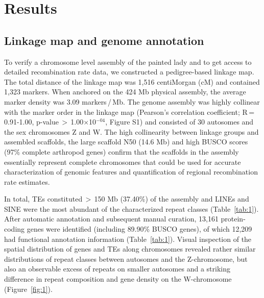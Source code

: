 \documentclass[twocolumn]{bmcart}%
\begin{document}
\section*{Results}
\subsection*{Linkage map and genome annotation}
To verify a chromosome level assembly of the painted lady \citep{lohse_genome_2021} and to get access to detailed recombination rate data, we constructed a pedigree-based linkage map. The total distance of the linkage map was 1,516 centiMorgan (cM) and contained 1,323 markers. When anchored on the 424 Mb physical assembly, the average marker density was 3.09 markers\,/\,Mb. The genome assembly was highly collinear with the marker order in the linkage map (Pearson’s correlation coefficient; R\,=\,0.91-1.00, p-value\,$>$\,1.00$\times$10$^{-04}$, Figure S1) and consisted of 30 autosomes and the sex chromosomes Z and W. The high collinearity between linkage groups and assembled scaffolds, the large scaffold N50 (14.6 Mb) and high BUSCO scores (97\% complete arthropod genes) confirm that the scaffolds in the assembly essentially represent complete chromosomes that could be used for accurate characterization of genomic features and quantification of regional recombination rate estimates.

In total, TEs constituted\,$>$\,150 Mb (37.40\%) of the assembly and LINEs and SINE were the most abundant of the characterized repeat classes (Table~\ref{tab:1}). After automatic annotation and subsequent manual curation, 13,161 protein-coding genes were identified (including 89.90\% BUSCO genes), of which 12,209 had functional annotation information (Table~\ref{tab:1}). Visual inspection of the spatial distribution of genes and TEs along chromosomes revealed rather similar distributions of repeat classes between autosomes and the Z-chromosome, but also an observable excess of repeats on smaller autosomes and a striking difference in repeat composition and gene density on the W-chromosome (Figure~\ref{fig:1}).
\end{document}
